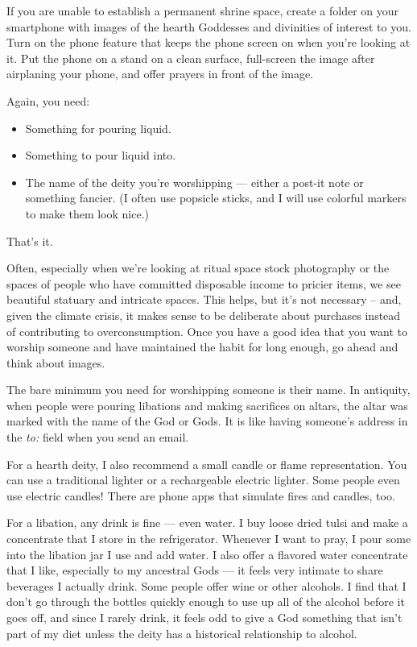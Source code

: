 \documentclass[
]{book}
\providecommand{\tightlist}{%
  \setlength{\itemsep}{0pt}\setlength{\parskip}{0pt}}
\begin{document}
If you are unable to establish a permanent shrine space, create a folder on your smartphone with images of the hearth Goddesses and divinities of interest to you. Turn on the phone feature that keeps the phone screen on when you're looking at it. Put the phone on a stand on a clean surface, full-screen the image after airplaning your phone, and offer prayers in front of the image.

Again, you need:

\begin{itemize}
\tightlist
\item
  Something for pouring liquid.
\item
  Something to pour liquid into.
\item
  The name of the deity you're worshipping --- either a post-it note or something fancier. (I often use popsicle sticks, and I will use colorful markers to make them look nice.)
\end{itemize}

That's it.

Often, especially when we're looking at ritual space stock photography or the spaces of people who have committed disposable income to pricier items, we see beautiful statuary and intricate spaces. This helps, but it's not necessary -- and, given the climate crisis, it makes sense to be deliberate about purchases instead of contributing to overconsumption. Once you have a good idea that you want to worship someone and have maintained the habit for long enough, go ahead and think about images.

The bare minimum you need for worshipping someone is their name. In antiquity, when people were pouring libations and making sacrifices on altars, the altar was marked with the name of the God or Gods. It is like having someone's address in the \emph{to:} field when you send an email.

For a hearth deity, I also recommend a small candle or flame representation. You can use a traditional lighter or a rechargeable electric lighter. Some people even use electric candles! There are phone apps that simulate fires and candles, too.

For a libation, any drink is fine --- even water. I buy loose dried tulsi and make a concentrate that I store in the refrigerator. Whenever I want to pray, I pour some into the libation jar I use and add water. I also offer a flavored water concentrate that I like, especially to my ancestral Gods --- it feels very intimate to share beverages I actually drink. Some people offer wine or other alcohols. I find that I don't go through the bottles quickly enough to use up all of the alcohol before it goes off, and since I rarely drink, it feels odd to give a God something that isn't part of my diet unless the deity has a historical relationship to alcohol.
\end{document}
